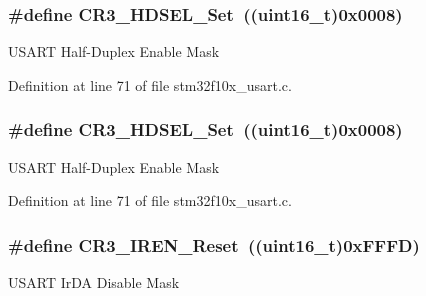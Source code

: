 \subsubsection[{\texorpdfstring{C\+R3\+\_\+\+H\+D\+S\+E\+L\+\_\+\+Set}{CR3_HDSEL_Set}}]{\setlength{\rightskip}{0pt plus 5cm}\#define C\+R3\+\_\+\+H\+D\+S\+E\+L\+\_\+\+Set~(({\bf uint16\+\_\+t})0x0008)}\hypertarget{group___u_s_a_r_t___private___defines_ga0c5c30ea9777d0c8c6f1b5ff85dfca3c}{}\label{group___u_s_a_r_t___private___defines_ga0c5c30ea9777d0c8c6f1b5ff85dfca3c}
U\+S\+A\+RT Half-\/\+Duplex Enable Mask 

Definition at line 71 of file stm32f10x\+\_\+usart.\+c.

\subsubsection[{\texorpdfstring{C\+R3\+\_\+\+H\+D\+S\+E\+L\+\_\+\+Set}{CR3_HDSEL_Set}}]{\setlength{\rightskip}{0pt plus 5cm}\#define C\+R3\+\_\+\+H\+D\+S\+E\+L\+\_\+\+Set~(({\bf uint16\+\_\+t})0x0008)}\hypertarget{group___u_s_a_r_t___private___defines_ga0c5c30ea9777d0c8c6f1b5ff85dfca3c}{}\label{group___u_s_a_r_t___private___defines_ga0c5c30ea9777d0c8c6f1b5ff85dfca3c}
U\+S\+A\+RT Half-\/\+Duplex Enable Mask 

Definition at line 71 of file stm32f10x\+\_\+usart.\+c.

\subsubsection[{\texorpdfstring{C\+R3\+\_\+\+I\+R\+E\+N\+\_\+\+Reset}{CR3_IREN_Reset}}]{\setlength{\rightskip}{0pt plus 5cm}\#define C\+R3\+\_\+\+I\+R\+E\+N\+\_\+\+Reset~(({\bf uint16\+\_\+t})0x\+F\+F\+F\+D)}\hypertarget{group___u_s_a_r_t___private___defines_gad1520358de97e48fe18780e5cc5296bd}{}\label{group___u_s_a_r_t___private___defines_gad1520358de97e48fe18780e5cc5296bd}
U\+S\+A\+RT Ir\+DA Disable Mask 


